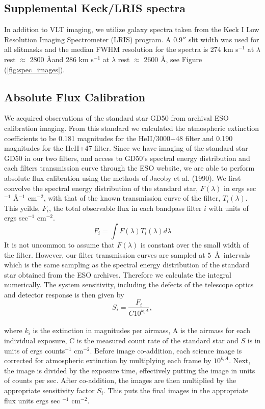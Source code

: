 \documentclass[twocolumn]{aastex6}
\begin{document}
\subsection{Supplemental Keck/LRIS spectra}
In addition to VLT imaging, we utilize galaxy spectra taken from the \cite{Rubin_2014} Keck I Low Resolution Imaging Spectrometer (LRIS) program. A $0.9''$ slit width was used for all slitmasks and the median FWHM resolution for the spectra is 274 km s$^{-1}$ at $\lambda$ rest $\approx$ 2800 \AA and 286 km s$^{-1}$  at $\lambda$ rest $\approx$ 2600 \AA, see Figure (\ref{fig:spec_images}).

\subsection{Absolute Flux Calibration}
We acquired observations of the standard star GD50 from archival ESO calibration imaging. From this standard we calculated the atmospheric extinction coefficients to be 0.181 magnitudes for the HeII/3000+48 filter and 0.190 magnitudes for the HeII+47 filter. Since we have imaging of the standard star GD50 in our two filters, and access to GD50's spectral energy distribution and each filters transmission curve through the ESO website, we are able to perform absolute flux calibration using the methods of Jacoby et al. (1990). We first convolve the spectral energy distribution of the standard star, $F(\lambda)$ in ergs sec$^{-1}$ \AA$^{-1}$ cm$^{-2}$, with that of the known transmission curve of the filter, $T_{i}(\lambda)$. This yeilds, $F_i$, the total observable flux in each bandpass filter $i$ with units of ergs sec$^{-1}$ cm$^{-2}$.
\begin{equation*}
F_{i}=\int F(\lambda)T_{i}(\lambda)d\lambda
\end{equation*}
It is not uncommon to assume that $F(\lambda)$ is constant over the small width of the filter. However, our filter transmission curves are sampled at $5$\ \AA\ intervals which is the same sampling as the spectral energy distribution of the standard star obtained from the ESO archives. Therefore we calculate the integral numerically.
The system sensitivity, including the defects of the telescope optics and detector response is then given by
\begin{equation*}
S_{i}=\dfrac{F_{i}}{C10^{k_{i}A}},
\end{equation*}\\
where $k_i$ is the extinction in magnitudes per airmass, A is the airmass for each individual exposure, C is the measured count rate of the standard star and $S$ is in units of ergs counts$^{-1}$ cm$^{-2}$. Before image co-addition, each science image is corrected for atmospheric extinction by multiplying each frame by $10^{k_{i}A}$. Next, the image is divided by the exposure time, effectively putting the image in units of counts per sec. After co-addition, the images are then multiplied by the appropriate sensitivity factor $S_{i}$. This puts the final images in the appropriate flux units ergs sec $^{-1}$ cm$^{-2}$.
\end{document}
